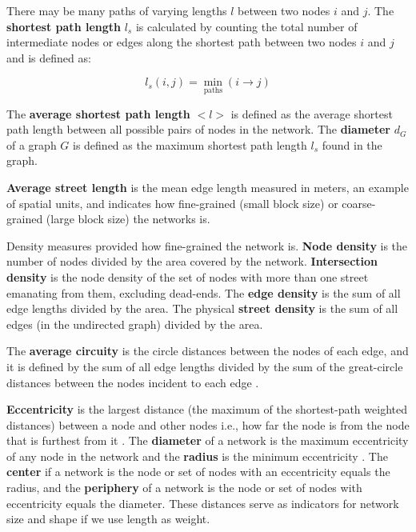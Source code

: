 There may be many paths of varying lengths $l$ between two nodes $i$ and $j$. The \textbf{shortest path length} $l_s$ is calculated by counting the total number of intermediate nodes or edges along the shortest path between two nodes $i$ and $j$ and is defined as:

\begin{equation} \label{eq:5}
	l_s(i,j) = \min_\text{paths}({i \to j})
\end{equation}

The \textbf{average shortest path length} $<l>$ is defined as the average shortest path length between all possible pairs of nodes in the network. The \textbf{diameter} $d_G$ of a graph $G$ is defined as the maximum shortest path length $l_s$ found in the graph.

\textbf{Average street length} is the mean edge length measured in meters, an example of spatial units, and indicates how fine-grained (small block size) or coarse-grained (large block size) the networks is.

Density measures provided how fine-grained the network is. \textbf{Node density} is the number of nodes divided by the area covered by the network. \textbf{Intersection density} is the node density of the set of nodes with more than one street emanating from them, excluding dead-ends. The \textbf{edge density} is the sum of all edge lengths divided by the area. The physical \textbf{street density} is the sum of all edges (in the undirected graph) divided by the area.

The \textbf{average circuity} is the circle distances between the nodes of each edge, and it is defined by the sum of all edge lengths divided by the sum of the great-circle distances between the nodes incident to each edge \cite{giacomin-levinson_2015}.

\textbf{Eccentricity} is the largest distance (the maximum of the shortest-path weighted distances) between a node and other nodes i.e., how far the node is from the node that is furthest from it \cite{urban-keitt_2001}. The \textbf{diameter} of a network is the maximum eccentricity of any node in the network and the \textbf{radius} is the minimum eccentricity \cite{hage-harary_1995}. The \textbf{center} if a network is the node or set of nodes with an eccentricity equals the radius, and the \textbf{periphery} of a network is the node or set of nodes with eccentricity equals the diameter. These distances serve as indicators for network size and shape if we use length as weight. 

